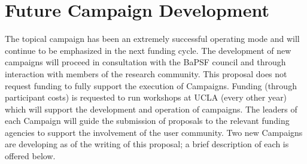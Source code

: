 \documentclass[11pt]{article}
\begin{document}
\section{Future Campaign Development}

The topical campaign has been an extremely successful operating mode
and will continue to be emphasized in the next funding cycle. The
development of new campaigns will proceed in consultation with the
BaPSF council and through interaction with members of the research
community.  This proposal does not request funding to fully support
the execution of Campaigns.  Funding (through participant costs) is
requested to run workshops at UCLA (every other year) which will support the
development and operation of campaigns.  The leaders of
each Campaign will guide the submission of proposals to the relevant funding agencies to
support the involvement of the user community.  Two new Campaigns are
developing as of the writing of this proposal; a brief description of
each is offered below.  
\end{document}
